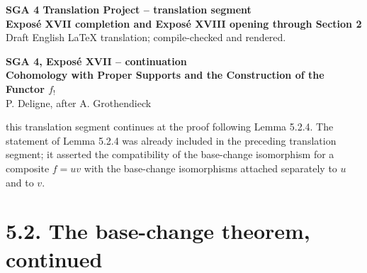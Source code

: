\documentclass[12pt]{article}
\begin{document}
\begin{center}
{\Large \textbf{SGA 4 Translation Project -- translation segment}}\\[0.4em]
{\large \textbf{Expos\'e XVII completion and Expos\'e XVIII opening through Section 2}}\\[0.25em]
{\normalsize Draft English LaTeX translation; compile-checked and rendered.}
\end{center}

\bigskip

\begin{center}
{\Large \textbf{SGA 4, Expos\'e XVII -- continuation}}\\[0.35em]
{\large \textbf{Cohomology with Proper Supports and the Construction of the Functor \(f_!\)}}\\[0.25em]
{\normalsize P. Deligne, after A. Grothendieck}
\end{center}

\bigskip

this translation segment continues at the proof following Lemma 5.2.4. The statement of Lemma 5.2.4 was already included in the preceding translation segment; it asserted the compatibility of the base-change isomorphism for a composite \(f=uv\) with the base-change isomorphisms attached separately to \(u\) and to \(v\).

\section*{5.2. The base-change theorem, continued}
\end{document}
